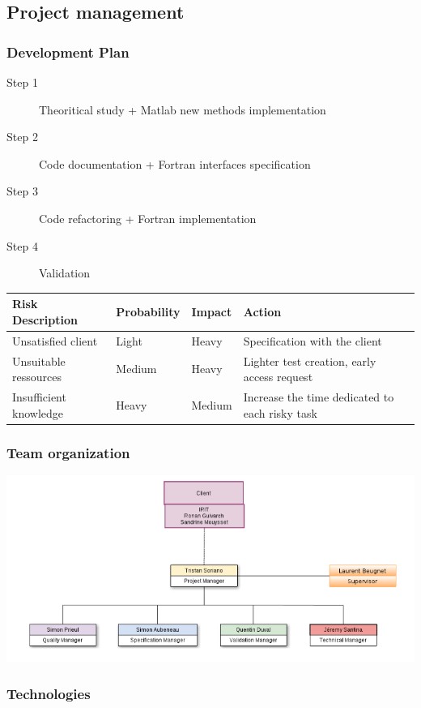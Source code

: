 \documentclass[10p]{beamer}
\begin{document}
\subsection{Project management}
\begin{frame}
\small
\frametitle{Development Plan}
\begin{description}
\item [Step 1] Theoritical study + Matlab new methods implementation
\item [Step 2] Code documentation + Fortran interfaces specification
\item [Step 3] Code refactoring + Fortran implementation
\item [Step 4] Validation
\end{description}
\tiny
\begin{tabular}{|l|l|l|l|}
\hline
\textbf{Risk Description} & \textbf{Probability} & \textbf{Impact} & \textbf{Action}
\\
\hline
Unsatisfied client & Light & Heavy & Specification with the client
\\
\hline
Unsuitable ressources & Medium & Heavy & Lighter test creation, early access request
\\
\hline
Insufficient knowledge & Heavy & Medium & Increase the time dedicated to each risky task
\\
\hline
\end{tabular}
\end{frame}
\begin{frame}
\frametitle{Team organization}
\includegraphics[width=\textwidth]{Image/organisation.png}
\end{frame}
\begin{frame}
\frametitle{Technologies}

\end{frame}
\end{document}
